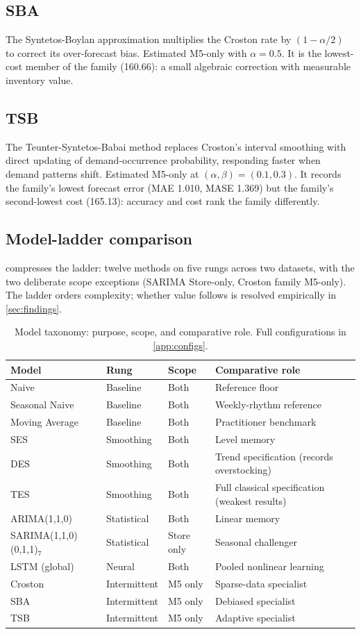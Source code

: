 \subsection{SBA}
\label{sec:m-sba}
The Syntetos-Boylan approximation \citep{syntetos2005} multiplies the Croston
rate by $(1-\alpha/2)$ to correct its over-forecast bias. Estimated M5-only
with $\alpha=0.5$. It is the lowest-cost member of the family (160.66): a
small algebraic correction with measurable inventory value.

\subsection{TSB}
\label{sec:m-tsb}
The Teunter-Syntetos-Babai method \citep{teunter2011} replaces Croston's
interval smoothing with direct updating of demand-occurrence probability,
responding faster when demand patterns shift. Estimated M5-only at
$(\alpha,\beta)=(0.1,0.3)$. It records the family's lowest forecast error
(MAE 1.010, MASE 1.369) but the family's second-lowest cost (165.13): accuracy
and cost rank the family differently.

\subsection{Model-ladder comparison}
\label{sec:ladder-compare}
 compresses the ladder: twelve methods on five rungs
across two datasets, with the two deliberate scope exceptions (SARIMA
Store-only, Croston family M5-only). The ladder orders complexity; whether
value follows is resolved empirically in \cref{sec:findings}.

\begin{table}[H]
\centering
\caption{Model taxonomy: purpose, scope, and comparative role. Full configurations in \cref{app:configs}.}
\label{tab:taxonomy}
\begin{tabular}{llll}
\toprule
Model & Rung & Scope & Comparative role \\
\midrule
Naive & Baseline & Both & Reference floor \\
Seasonal Naive & Baseline & Both & Weekly-rhythm reference \\
Moving Average & Baseline & Both & Practitioner benchmark \\
SES & Smoothing & Both & Level memory \\
DES & Smoothing & Both & Trend specification (records overstocking) \\
TES & Smoothing & Both & Full classical specification (weakest results) \\
ARIMA(1,1,0) & Statistical & Both & Linear memory \\
SARIMA(1,1,0)(0,1,1)$_7$ & Statistical & Store only & Seasonal challenger \\
LSTM (global) & Neural & Both & Pooled nonlinear learning \\
Croston & Intermittent & M5 only & Sparse-data specialist \\
SBA & Intermittent & M5 only & Debiased specialist \\
TSB & Intermittent & M5 only & Adaptive specialist \\
\bottomrule
\end{tabular}
\end{table}
